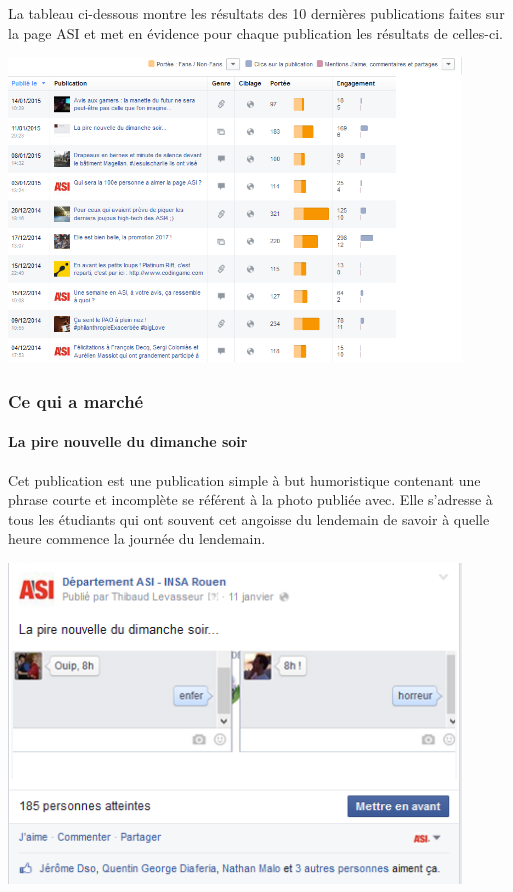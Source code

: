 La tableau ci-dessous montre les résultats des 10 dernières publications faites sur la page ASI et met en évidence pour chaque publication les résultats de celles-ci.

\begin{center}
	\includegraphics[width=0.90\textwidth]{images/DernierePublication.png}
\end{center}

\subsubsection{Ce qui a marché}
\paragraph{La pire nouvelle du dimanche soir}
Cet publication est une publication simple à but humoristique contenant une phrase courte et incomplète se référent à la photo publiée avec. Elle s'adresse à tous les étudiants qui ont souvent cet angoisse du lendemain de savoir à quelle heure commence la journée du lendemain.
\begin{center}
	\includegraphics[width=0.90\textwidth]{images/laPireNouvelle.png}
\end{center}

